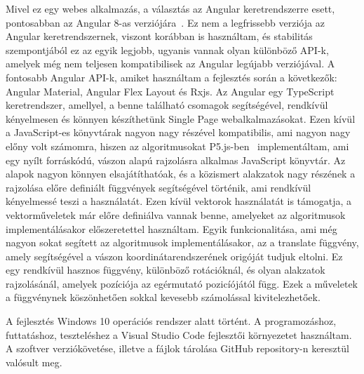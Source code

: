Mivel ez egy webes alkalmazás, a választás az Angular keretrendszerre esett, pontosabban az Angular 8-as verziójára~\cite{angular}. Ez nem a legfrissebb verziója az Angular keretrendszernek, viszont korábban is használtam, és stabilitás szempontjából ez az egyik legjobb, ugyanis vannak olyan különböző API-k, amelyek még nem teljesen kompatibilisek az Angular legújabb verziójával. A fontosabb Angular API-k, amiket használtam a fejlesztés során a következők: Angular Material, Angular Flex Layout és Rxjs. Az Angular egy TypeScript keretrendszer, amellyel, a benne található csomagok segítségével, rendkívül kényelmesen és könnyen készíthetünk Single Page webalkalmazásokat. Ezen kívül a JavaScript-es könyvtárak nagyon nagy részével kompatibilis, ami nagyon nagy előny volt számomra, hiszen az algoritmusokat P5.js-ben~\cite{p5} implementáltam, ami egy nyílt forráskódú, vászon alapú rajzolásra alkalmas JavaScript könyvtár. Az alapok nagyon könnyen elsajátíthatóak, és a közismert alakzatok nagy részének a rajzolása előre definiált függvények segítségével történik, ami rendkívül kényelmessé teszi a használatát. Ezen kívül vektorok használatát is támogatja, a vektorműveletek már előre definiálva vannak benne, amelyeket az algoritmusok implementálásakor előszeretettel használtam. Egyik funkcionalitása, ami még nagyon sokat segített az algoritmusok implementálásakor, az a translate függvény, amely segítségével a vászon koordinátarendszerének origóját tudjuk eltolni. Ez egy rendkívül hasznos függvény, különböző rotációknál, és olyan alakzatok rajzolásánál, amelyek pozíciója az egérmutató pozicíójától függ. Ezek a műveletek a függvénynek köszönhetően sokkal kevesebb számolással kivitelezhetőek.
\par
A fejlesztés Windows 10 operációs rendszer alatt történt. A programozáshoz, futtatáshoz, teszteléshez a Visual Studio Code fejlesztői környezetet használtam. A szoftver verziókövetése, illetve a fájlok tárolása GitHub repository-n keresztül valósult meg.
